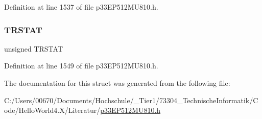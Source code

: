 Definition at line 1537 of file p33\+E\+P512\+M\+U810.\+h.

\mbox{\label{structtag_i2_c1_s_t_a_t_b_i_t_s_ab0728a3da8f26dbbebc4740b6b4c3531}} 
\subsubsection{\texorpdfstring{T\+R\+S\+T\+AT}{TRSTAT}}
{\footnotesize\ttfamily unsigned T\+R\+S\+T\+AT}



Definition at line 1549 of file p33\+E\+P512\+M\+U810.\+h.



The documentation for this struct was generated from the following file\+:\begin{DoxyCompactItemize}
\item 
C\+:/\+Users/00670/\+Documents/\+Hochschule/\+\_\+\+Tier1/73304\+\_\+\+Technische\+Informatik/\+Code/\+Hello\+World4.\+X/\+Literatur/\hyperlink{p33_e_p512_m_u810_8h}{p33\+E\+P512\+M\+U810.\+h}\end{DoxyCompactItemize}
